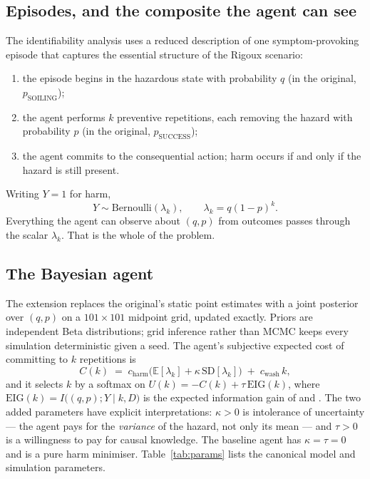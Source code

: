 \documentclass[11pt]{article}
\newcommand{\lamk}{\lambda_k}
\begin{document}
\subsection{Episodes, and the composite the agent can see}

The identifiability analysis uses a reduced description of one
symptom-provoking episode that captures the essential structure of the Rigoux
scenario:
\begin{enumerate}\itemsep2pt
\item the episode begins in the hazardous state with probability $q$ (in the
      original, $p_{\mathrm{SOILING}}$);
\item the agent performs $k$ preventive repetitions, each removing the hazard
      with probability $p$ (in the original, $p_{\mathrm{SUCCESS}}$);
\item the agent commits to the consequential action; harm occurs if and only if
      the hazard is still present.
\end{enumerate}
Writing $Y=1$ for harm,
\begin{equation}
Y \sim \mathrm{Bernoulli}(\lamk), \qquad \lamk = q(1-p)^{k}.
\label{eq:lambda}
\end{equation}
Everything the agent can observe about $(q,p)$ from outcomes passes through the
scalar $\lamk$. That is the whole of the problem.

\subsection{The Bayesian agent}

The extension replaces the original's static point estimates with a joint posterior over
$(q,p)$ on a $101\times101$ midpoint grid, updated exactly. Priors are
independent Beta distributions; grid inference rather than MCMC keeps every
simulation deterministic given a seed. The agent's subjective expected cost of
committing to $k$ repetitions is
\begin{equation}
C(k) \;=\; c_{\mathrm{harm}}\Big(\mathbb{E}[\lamk] + \kappa\,\mathrm{SD}[\lamk]\Big)
        \;+\; c_{\mathrm{wash}}\,k ,
\label{eq:cost}
\end{equation}
and it selects $k$ by a softmax on $U(k) = -C(k) + \tau\,\mathrm{EIG}(k)$, where
$\mathrm{EIG}(k) = I\big((q,p);Y \mid k, D\big)$ is the expected information gain
of \citet{lindley1956measure} and \citet{chaloner1995bayesian}. The two added
parameters have explicit interpretations: $\kappa>0$ is
intolerance of uncertainty --- the agent pays for the \emph{variance} of the
hazard, not only its mean --- and $\tau>0$ is a willingness to pay for causal
knowledge. The baseline agent has $\kappa=\tau=0$ and is a pure harm minimiser.
Table~\ref{tab:params} lists the canonical model and simulation parameters.
\end{document}
